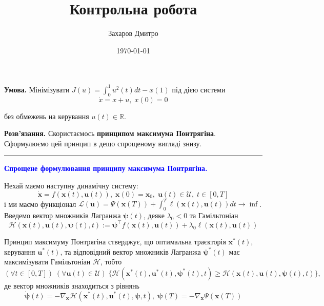 \documentclass[oneside,solution]{template}
\title{Контрольна робота}
\author{Захаров Дмитро}
\date{\today}
\begin{document}
\maketitle



\hspace{20px}\textbf{Умова.} Мінімізувати $J(u) = \int_0^{1}u^2(t)dt - x(1)$ під дією системи
\begin{equation*}
    \dot{x} = x + u, \; x(0) = 0
\end{equation*}

без обмежень на керування $u(t) \in \mathbb{R}$.

\textbf{Розв'язання.} Скористаємось \textbf{принципом максимума Понтрягіна}. Сформулюємо цей принцип в дещо спрощеному вигляді знизу.

\noindent\rule{8cm}{0.4pt}

\textcolor{blue}{\textbf{Спрощене формулювання принципу максимума Понтрягіна.}} 

Нехай маємо наступну динамічну систему:
\begin{equation}
    \dot{\mathbf{x}} = f(\mathbf{x}(t), \mathbf{u}(t)), \; \mathbf{x}(0) = \mathbf{x}_0, \; \mathbf{u}(t) \in \mathcal{U}, \; t \in [0,T]
\end{equation}
і ми маємо функціонал $\mathcal{L}(\mathbf{u}) = \Psi(\mathbf{x}(T)) + \int_0^T \ell(\mathbf{x}(t), \mathbf{u}(t))dt \to \inf$. Введемо вектор множників Лагранжа $\boldsymbol{\psi}(t)$, деяке $\lambda_0 < 0$ та Гамільтоніан
\begin{equation*}
    \mathcal{H}(\mathbf{x}(t), \mathbf{u}(t), \boldsymbol{\psi}(t), t) := \boldsymbol{\psi}^{\top}f(\mathbf{x}(t), \mathbf{u}(t)) + \lambda_0\ell(\mathbf{x}(t), \mathbf{u}(t))
\end{equation*}

Принцип максимуму Понтрягіна стверджує, що оптимальна траєкторія $\mathbf{x}^*(t)$, керування $\mathbf{u}^*(t)$, та відповідний вектор множників Лагранжа $\boldsymbol{\psi}^*(t)$ має максимізувати Гамільтоніан $\mathcal{H}$, тобто
\begin{equation}\label{pontryagin-condition-1}
    (\forall t \in [0,T]) \; (\forall \mathbf{u}(t) \in \mathcal{U})\; \{\mathcal{H}(\mathbf{x}^*(t), \mathbf{u}^*(t), \boldsymbol{\psi}^*(t), t) \geq \mathcal{H}(\mathbf{x}(t), \mathbf{u}(t), \boldsymbol{\psi}(t), t)\},
\end{equation}
де вектор множників знаходиться з рівнянь
\begin{equation}\label{pontryagin-condition-2}
    \dot{\boldsymbol{\psi}}(t) = -\nabla_{\mathbf{x}} \mathcal{H}(\mathbf{x}^*(t), \mathbf{u}^*(t), \boldsymbol{\psi},t), \; \boldsymbol{\psi}(T) = -\nabla_{\mathbf{x}}\Psi(\mathbf{x}(T))
\end{equation}
\end{document}

